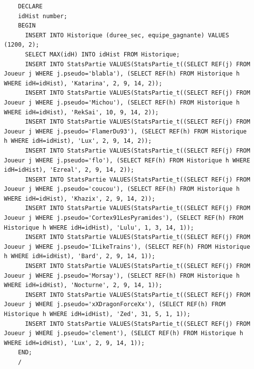 \documentclass[a4paper,10pt]{report}
\begin{document}
\begin{lstlisting}
    DECLARE
    idHist number;
    BEGIN
      INSERT INTO Historique (duree_sec, equipe_gagnante) VALUES (1200, 2);
      SELECT MAX(idH) INTO idHist FROM Historique;
      INSERT INTO StatsPartie VALUES(StatsPartie_t((SELECT REF(j) FROM Joueur j WHERE j.pseudo='blabla'), (SELECT REF(h) FROM Historique h WHERE idH=idHist), 'Katarina', 2, 9, 14, 2));
      INSERT INTO StatsPartie VALUES(StatsPartie_t((SELECT REF(j) FROM Joueur j WHERE j.pseudo='Michou'), (SELECT REF(h) FROM Historique h WHERE idH=idHist), 'RekSai', 10, 9, 14, 2));
      INSERT INTO StatsPartie VALUES(StatsPartie_t((SELECT REF(j) FROM Joueur j WHERE j.pseudo='FlamerDu93'), (SELECT REF(h) FROM Historique h WHERE idH=idHist), 'Lux', 2, 9, 14, 2));
      INSERT INTO StatsPartie VALUES(StatsPartie_t((SELECT REF(j) FROM Joueur j WHERE j.pseudo='flo'), (SELECT REF(h) FROM Historique h WHERE idH=idHist), 'Ezreal', 2, 9, 14, 2));
      INSERT INTO StatsPartie VALUES(StatsPartie_t((SELECT REF(j) FROM Joueur j WHERE j.pseudo='coucou'), (SELECT REF(h) FROM Historique h WHERE idH=idHist), 'Khazix', 2, 9, 14, 2));
      INSERT INTO StatsPartie VALUES(StatsPartie_t((SELECT REF(j) FROM Joueur j WHERE j.pseudo='Cortex91LesPyramides'), (SELECT REF(h) FROM Historique h WHERE idH=idHist), 'Lulu', 1, 3, 14, 1));
      INSERT INTO StatsPartie VALUES(StatsPartie_t((SELECT REF(j) FROM Joueur j WHERE j.pseudo='ILikeTrains'), (SELECT REF(h) FROM Historique h WHERE idH=idHist), 'Bard', 2, 9, 14, 1));
      INSERT INTO StatsPartie VALUES(StatsPartie_t((SELECT REF(j) FROM Joueur j WHERE j.pseudo='Morsay'), (SELECT REF(h) FROM Historique h WHERE idH=idHist), 'Nocturne', 2, 9, 14, 1));
      INSERT INTO StatsPartie VALUES(StatsPartie_t((SELECT REF(j) FROM Joueur j WHERE j.pseudo='xXDragonForceXx'), (SELECT REF(h) FROM Historique h WHERE idH=idHist), 'Zed', 31, 5, 1, 1));
      INSERT INTO StatsPartie VALUES(StatsPartie_t((SELECT REF(j) FROM Joueur j WHERE j.pseudo='clement'), (SELECT REF(h) FROM Historique h WHERE idH=idHist), 'Lux', 2, 9, 14, 1));
    END;
    /


\end{lstlisting}
\end{document}
